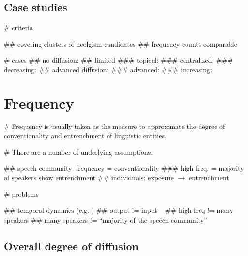 \documentclass[
  a4paper,
  ]{scrartcl}
\begin{document}
  \subsection{Case studies}

    \begin{easylist}[itemize]

      # criteria

        ## covering clusters of neolgism candidates
        ## frequency counts comparable

      # cases \parencite{Kerremans2015}
        ## no diffusion: 
        ## limited
          ### topical: 
          ### centralized: 
          ### decreasing: 
        ## advanced diffusion:
          ### advanced: 
          ### increasing: 

    \end{easylist}

\section{Frequency}

  \begin{easylist}[itemize]

    # Frequency is usually taken as the measure to approximate the degree of conventionality and entrenchment of linguistic entities.

    # There are a number of underlying assumptions.

      ## speech community: frequency = conventionality
        ### high freq. = majority of speakers show entrenchment
      ## individuals: exposure $\rightarrow$ entrenchment

    # problems

      ## temporal dynamics (e.g. )
      ## output != input ~\parencite{Stefanowitsch2017}
      ## high freq != many speakers
      ## many speakers != \enquote{majority of the speech community}

  \end{easylist}

  \subsection{Overall degree of diffusion}
\end{document}
